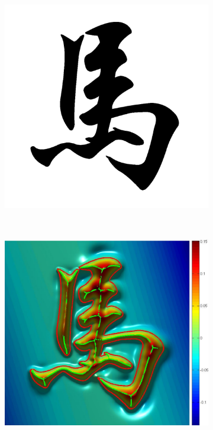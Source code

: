 \documentclass[annual]{acmsiggraph}
\begin{document}
\begin{figure}
        \centering
		\begin{subfigure}[b]{0.16\linewidth}
                \centering
                \includegraphics[width=\textwidth]{images/horse/horse.pdf}
        \end{subfigure}
        ~
		\begin{subfigure}[b]{0.18\linewidth}
                \centering
                \includegraphics[width=\textwidth]{images/horse/horse_3d.pdf}

\end{subfigure}
\end{figure}
\end{document}
